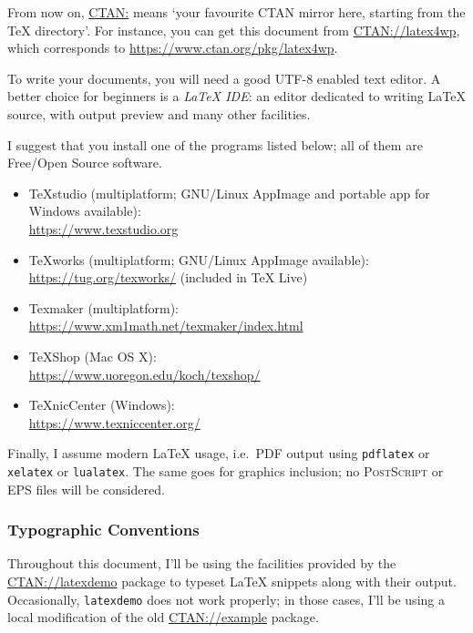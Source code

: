 \documentclass[a4paper,11pt]{article}
\newcommand{\PS}{\textsc{PostScript}}
\newcommand{\app}[1]
{\texttt{#1}}
\newcommand{\ltx}[1]
{\texttt{#1}}
\begin{document}
From now on, \href{https://www.ctan.org}{CTAN:} means `your
favourite CTAN mirror here, starting from the \TeX{} directory'. For
instance, you can get this document from
\href{https://www.ctan.org/pkg/latex4wp}{CTAN://latex4wp}, which
corresponds to \url{https://www.ctan.org/pkg/latex4wp}.

To write your documents, you will need a good UTF-8 enabled text
editor. A better choice for beginners is a \emph{\LaTeX{} IDE}: an
editor dedicated to writing \LaTeX{} source, with output preview
and many other facilities.

I suggest that you install one of the programs listed below; all of
them are Free/Open Source software.

\begin{itemize}

  \item TeXstudio (multiplatform; GNU/Linux AppImage and portable app for
  Windows available):\\
  \url{https://www.texstudio.org}

  \item TeXworks (multiplatform; GNU/Linux AppImage available):\\
  \url{https://tug.org/texworks/} (included in TeX Live)

  \item Texmaker (multiplatform):\\
  \url{https://www.xm1math.net/texmaker/index.html}

  \item TeXShop (Mac OS X):\\
  \url{https://www.uoregon.edu/koch/texshop/}

  \item TeXnicCenter (Windows):\\
  \url{https://www.texniccenter.org/}

\end{itemize}

Finally, I assume modern \LaTeX{} usage, i.e.\ PDF output using
\app{pdflatex} or \app{xelatex} or \app{lualatex}. The same goes for
graphics inclusion; no \PS{} or EPS files will be considered.


\subsubsection{Typographic Conventions}

Throughout this document, I'll be using the facilities provided by the
\href{https://www.ctan.org/pkg/latexdemo}{CTAN://latexdemo} package to
typeset \LaTeX{} snippets along with their output.  Occasionally,
\ltx{latexdemo} does not work properly; in those cases, I'll be using a
local modification of the old
\href{https://www.ctan.org/pkg/example}{CTAN://example} package.
\end{document}

